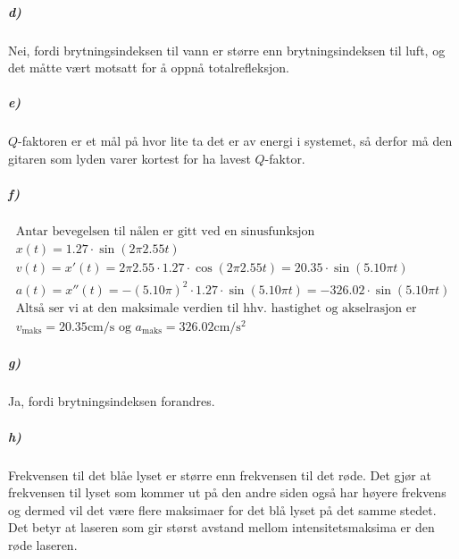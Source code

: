 \documentclass[11pt, A4paper,norsk]{article}
\begin{document}
			\subparagraph{d)}
				\begin{flushleft}
Nei, fordi brytningsindeksen til vann er større enn brytningsindeksen til luft, og det måtte vært motsatt for å oppnå totalrefleksjon.
				\end{flushleft}










			\subparagraph{e)}
				\begin{flushleft}
$Q$-faktoren er et mål på hvor lite ta det er av energi i systemet, så derfor må den gitaren som lyden varer kortest for ha lavest $Q$-faktor.
				\end{flushleft}









			\subparagraph{f)}
				\begin{gather*}
\text{Antar bevegelsen til nålen er gitt ved en sinusfunksjon} \\
x(t) = 1.27 \cdot \sin(2 \pi 2.55 t) \\
v(t) = x'(t) = 2 \pi 2.55 \cdot 1.27 \cdot \cos(2 \pi 2.55 t) = 20.35 \cdot \sin(5.10 \pi t) \\
a(t) = x''(t) = - (5.10 \pi)^2 \cdot 1.27 \cdot \sin(5.10 \pi t) = - 326.02 \cdot \sin(5.10 \pi t) \\
\text{Altså ser vi at den maksimale verdien til hhv. hastighet og akselrasjon er} \\
\text{$v_{\text{maks}} = 20.35 \text{cm$/$s}$ og $a_{\text{maks}} = 326.02 \text{cm$/$s$^2$}$}
				\end{gather*}












			\subparagraph{g)}
				\begin{flushleft}
Ja, fordi brytningsindeksen forandres.
				\end{flushleft}












			\subparagraph{h)}
				\begin{flushleft}
Frekvensen til det blåe lyset er større enn frekvensen til det røde. Det gjør at frekvensen til lyset som kommer ut på den andre siden også har høyere frekvens og dermed vil det være flere maksimaer for det blå lyset på det samme stedet. Det betyr at laseren som gir størst avstand mellom intensitetsmaksima er den røde laseren.
				\end{flushleft}
\end{document}
